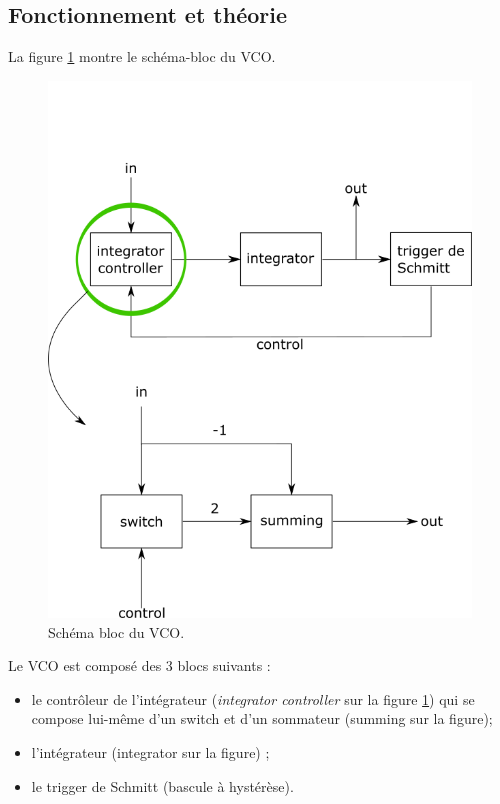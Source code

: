 
\subsection{Fonctionnement et théorie}
La figure \ref{fig:schema_bloc_vco} montre le schéma-bloc du VCO.

\begin{figure}[ht]
	\centering
	\includegraphics[scale=0.3]{img-vco/schema_bloc_vco.png}
	\caption{Schéma bloc du VCO.}
	\label{fig:schema_bloc_vco}
\end{figure}

Le VCO est composé des 3 blocs suivants :
\begin{itemize}
	\item le contrôleur de l'intégrateur (\textit{integrator controller} sur la figure \ref{fig:schema_bloc_vco}) qui se compose lui-même d'un switch et d'un sommateur (summing sur la figure);
	\item l'intégrateur (integrator sur la figure) ;
	\item le trigger de Schmitt (bascule à hystérèse).
\end{itemize}

